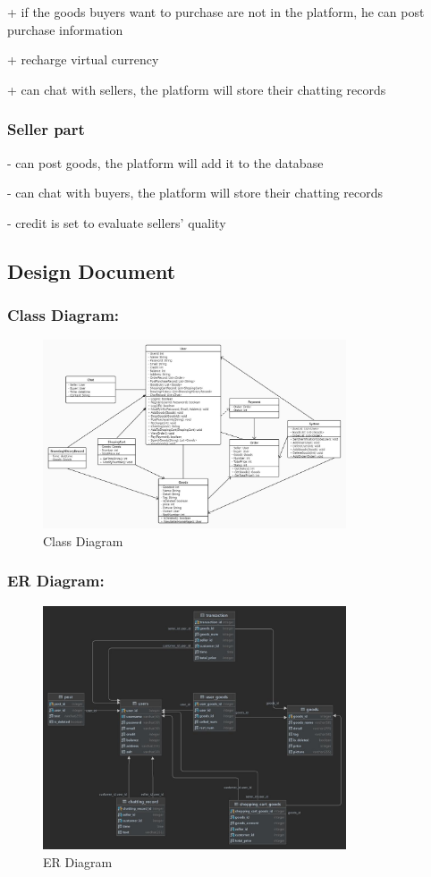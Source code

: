 \documentclass[12pt]{article}  %
\begin{document}
+ if the goods buyers want to purchase are not in 
the platform, he can post purchase information

+ recharge virtual currency

+ can chat with sellers, the platform will store 
their chatting records
\subsubsection*{Seller part}
- can post goods, the platform will add it to 
the database

- can chat with buyers, the platform will store 
their chatting records

- credit is set to evaluate sellers' quality

\subsection{Design Document}
\subsubsection*{Class Diagram:}
\begin{figure}[H]
	\centering
	\includegraphics[width=0.8\textwidth]{images/classDiagram.jpg}
	\caption{Class Diagram}
\end{figure}

\subsubsection*{ER Diagram: }
\begin{figure}[H]
	\centering
	\includegraphics[width=0.8\textwidth]{images/ERDiagram.jpg}
	\caption{ER Diagram}
\end{figure}
\end{document}
